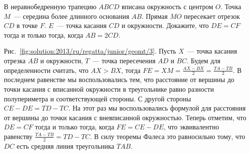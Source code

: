 \problem
В неравнобедренную трапецию $ABCD$ вписана окружность с центром $O$.
Точка $M$~--- середина более длинного основания $AB$.
Прямая $MO$ пересекает отрезок $CD$ в точке $F$.
$E$~--- точка касания $CD$ и окружности.
Докажите, что $DE = CF$ тогда и только тогда, когда $AB = 2 CD$.

%
\label{solution:2013/ru/regatta/junior/geomt/3}%
Рис.~\ref{fig:solution:2013/ru/regatta/junior/geomt/3}.
Пусть $X$~--- точка касания отрезка $AB$ и окружности, $T$~--- точка
пересечения $AD$ и $BC$.
Будем для определенности считать, что $AX > BX$, тогда
$FE = XM = \frac{AX - BX}{2} = \frac{TA - TB}{2}$.
В последнем равенстве мы воспользовались тем, что расстояние от вершины до
точки касания с вписанной окружности в треугольнике равно разности
полупериметра и соответствующей стороны.
С другой стороны $CE - DE = TD - TC$.
На этот раз мы воспользовались формулой для расстояния от вершины до точки
касания с вневписанной окружностью.
Теперь отметим, что $DE = CF$ тогда и только тогда, когда $FE = CE - DE$, что
эквивалентно равенству $\frac{TA - TB}{2} = TD - TC$.
В силу теоремы Фалеса это равносильно тому, что $DC$ есть средняя линия
треугольника $TAB$.
\endproblem
